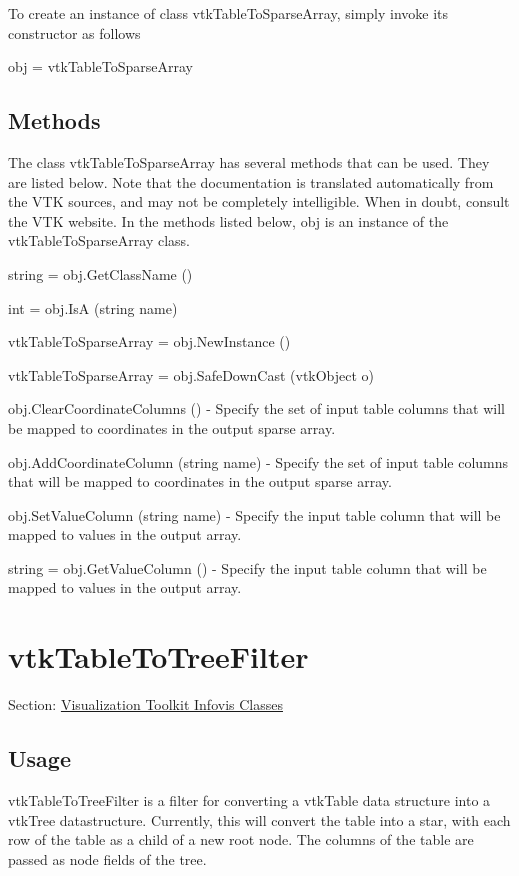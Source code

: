 To create an instance of class vtk\-Table\-To\-Sparse\-Array, simply invoke its constructor as follows \begin{DoxyVerb}  obj = vtkTableToSparseArray
\end{DoxyVerb}
 \hypertarget{vtkwidgets_vtkxyplotwidget_Methods}{}\subsection{Methods}\label{vtkwidgets_vtkxyplotwidget_Methods}
The class vtk\-Table\-To\-Sparse\-Array has several methods that can be used. They are listed below. Note that the documentation is translated automatically from the V\-T\-K sources, and may not be completely intelligible. When in doubt, consult the V\-T\-K website. In the methods listed below, {\ttfamily obj} is an instance of the vtk\-Table\-To\-Sparse\-Array class. 
\begin{DoxyItemize}
\item {\ttfamily string = obj.\-Get\-Class\-Name ()}  
\item {\ttfamily int = obj.\-Is\-A (string name)}  
\item {\ttfamily vtk\-Table\-To\-Sparse\-Array = obj.\-New\-Instance ()}  
\item {\ttfamily vtk\-Table\-To\-Sparse\-Array = obj.\-Safe\-Down\-Cast (vtk\-Object o)}  
\item {\ttfamily obj.\-Clear\-Coordinate\-Columns ()} -\/ Specify the set of input table columns that will be mapped to coordinates in the output sparse array.  
\item {\ttfamily obj.\-Add\-Coordinate\-Column (string name)} -\/ Specify the set of input table columns that will be mapped to coordinates in the output sparse array.  
\item {\ttfamily obj.\-Set\-Value\-Column (string name)} -\/ Specify the input table column that will be mapped to values in the output array.  
\item {\ttfamily string = obj.\-Get\-Value\-Column ()} -\/ Specify the input table column that will be mapped to values in the output array.  
\end{DoxyItemize}\hypertarget{vtkinfovis_vtktabletotreefilter}{}\section{vtk\-Table\-To\-Tree\-Filter}\label{vtkinfovis_vtktabletotreefilter}
Section\-: \hyperlink{sec_vtkinfovis}{Visualization Toolkit Infovis Classes} \hypertarget{vtkwidgets_vtkxyplotwidget_Usage}{}\subsection{Usage}\label{vtkwidgets_vtkxyplotwidget_Usage}
vtk\-Table\-To\-Tree\-Filter is a filter for converting a vtk\-Table data structure into a vtk\-Tree datastructure. Currently, this will convert the table into a star, with each row of the table as a child of a new root node. The columns of the table are passed as node fields of the tree.

